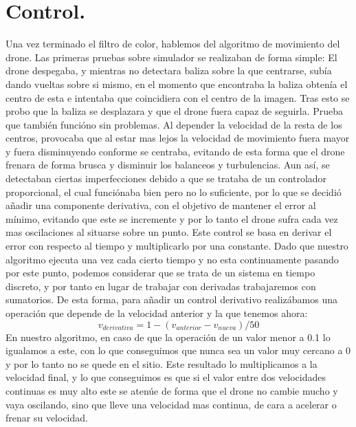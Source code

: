 \section{Control.}
\hspace{1cm} Una vez terminado el filtro de color, hablemos del algoritmo de movimiento del drone. Las primeras pruebas sobre simulador se realizaban de forma simple: El drone despegaba, y mientras no detectara baliza sobre la que centrarse, sub\'ia dando vueltas sobre si mismo, en el momento que encontraba la baliza obten\'ia el centro de esta e intentaba que coincidiera con el centro de la imagen. Tras esto se probo que la baliza se desplazara y que el drone fuera capaz de seguirla. Prueba que tambi\'en funci\'ono sin problemas. Al depender la velocidad de la resta de los centros, provocaba que al estar mas lejos la velocidad de movimiento fuera mayor y fuera disminuyendo conforme se centraba, evitando de esta forma que el drone frenara de forma brusca y disminuir los balanceos y turbulencias. 
Aun as\'i, se detectaban ciertas imperfecciones debido a que se trataba de un controlador proporcional, el cual funci\'onaba bien pero no lo suficiente, por lo que se decidi\'o añadir una componente derivativa, con el objetivo de mantener el error al m\'inimo, evitando que este se incremente y por lo tanto el drone sufra cada vez mas oscilaciones al situarse sobre un punto. Este control se basa en derivar el error con respecto al tiempo y multiplicarlo por una constante. Dado que nuestro algoritmo ejecuta una vez cada cierto tiempo y no esta continuamente pasando por este punto, podemos considerar que se trata de un sistema en tiempo discreto, y por tanto en lugar de trabajar con derivadas trabajaremos con sumatorios. De esta forma, para añadir un control derivativo realiz\'abamos una operaci\'on que depende de la velocidad anterior y la que tenemos ahora: \[v_{derivativa} =1-(v_{anterior}-v_{nueva})/50 \]  
\hspace{1cm} En nuestro algoritmo, en caso de que la operaci\'on de un valor menor a 0.1 lo igualamos a este, con lo que conseguimos que nunca sea un valor muy cercano a 0 y por lo tanto no se quede en el sitio. Este resultado lo multiplicamos a la velocidad final, y lo que conseguimos es que si el valor entre dos velocidades continuas es muy alto este se aten\'ue de forma que el drone no cambie mucho y vaya oscilando, sino que lleve una velocidad mas continua, de cara a acelerar o frenar su velocidad. 

